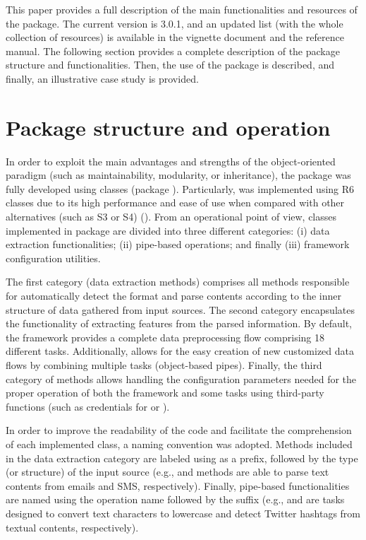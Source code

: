 This paper provides a full description of the main functionalities and resources of the  package. The current version is 3.0.1, and an updated list (with the whole collection of resources) is available in the vignette document and the reference manual. The following section provides a complete description of the package structure and functionalities. Then, the use of the package is described, and finally, an illustrative case study is provided.

\section{Package structure and operation}

In order to exploit the main advantages and strengths of the object-oriented paradigm (such as maintainability, modularity, or inheritance), the  package was fully developed using  classes (package  \citep{R6}). Particularly,  was implemented using R6 classes due to its high performance and ease of use when compared with other alternatives (such as S3 or S4) (\cite{D38, D39}). From an operational point of view,  classes implemented in  package are divided into three different categories: (i) data extraction functionalities; (ii) pipe-based operations; and finally (iii)  framework configuration utilities.

The first category (data extraction methods) comprises all methods responsible for automatically detect the format and parse contents according to the inner structure of data gathered from input sources. The second category encapsulates the functionality of extracting features from the parsed information. By default, the  framework provides a complete data preprocessing flow comprising 18 different tasks. Additionally,  allows for the easy creation of new customized data flows by combining multiple tasks (object-based pipes). Finally, the third category of methods allows handling the configuration parameters needed for the proper operation of both the  framework and some tasks using third-party functions (such as credentials for  \citep{D31} or  \citep{D32}). 

In order to improve the readability of the code and facilitate the comprehension of each implemented class, a naming convention was adopted. Methods included in the data extraction category are labeled using  as a prefix, followed by the type (or structure) of the input source (e.g.,  and  methods are able to parse text contents from emails and SMS, respectively). Finally, pipe-based functionalities are named using the operation name followed by the suffix  (e.g.,  and  are tasks designed to convert text characters to lowercase and detect Twitter hashtags from textual contents, respectively). 

